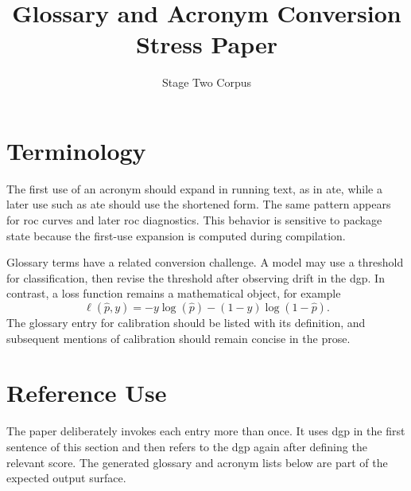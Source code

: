 \documentclass[11pt]{article}
\title{Glossary and Acronym Conversion Stress Paper}
\author{Stage Two Corpus}
\date{}
\let\printglossaries\printnoidxglossaries
\begin{document}
\maketitle

\section{Terminology}

The first use of an acronym should expand in running text, as in \gls{ate}, while a later use such as \gls{ate} should use the shortened form. The same pattern appears for \gls{roc} curves and later \gls{roc} diagnostics. This behavior is sensitive to package state because the first-use expansion is computed during compilation.

Glossary terms have a related conversion challenge. A model may use a \gls{threshold} for classification, then revise the \gls{threshold} after observing drift in the \gls{dgp}. In contrast, a \gls{loss} function remains a mathematical object, for example
\[
  \ell(\hat{p},y)= -y\log(\hat{p})-(1-y)\log(1-\hat{p}).
\]
The glossary entry for \gls{calibration} should be listed with its definition, and subsequent mentions of \gls{calibration} should remain concise in the prose.

\section{Reference Use}

The paper deliberately invokes each entry more than once. It uses \gls{dgp} in the first sentence of this section and then refers to the \gls{dgp} again after defining the relevant score. The generated glossary and acronym lists below are part of the expected output surface.

\printglossaries
\end{document}
